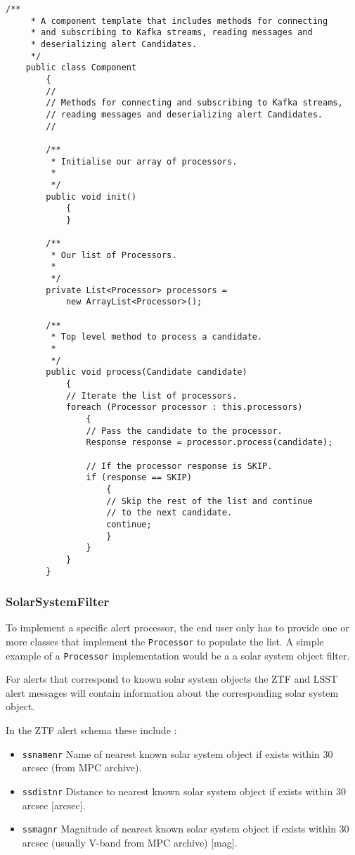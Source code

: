 \documentclass{article}
\newcommand{\ztf} {ZTF\xspace}
\newcommand{\lsst} {LSST\xspace}
\begin{document}
\begin{lstlisting}[style=Java]
    /**
     * A component template that includes methods for connecting
     * and subscribing to Kafka streams, reading messages and
     * deserializing alert Candidates.
     */
    public class Component
        {
        //
        // Methods for connecting and subscribing to Kafka streams,
        // reading messages and deserializing alert Candidates.
        //

        /**
         * Initialise our array of processors.
         *
         */
        public void init()
            {
            }

        /**
         * Our list of Processors.
         *
         */
        private List<Processor> processors =
            new ArrayList<Processor>();

        /**
         * Top level method to process a candidate.
         *
         */
        public void process(Candidate candidate)
            {
            // Iterate the list of processors.
            foreach (Processor processor : this.processors)
                {
                // Pass the candidate to the processor.
                Response response = processor.process(candidate);

                // If the processor response is SKIP.
                if (response == SKIP)
                    {
                    // Skip the rest of the list and continue
                    // to the next candidate.
                    continue;
                    }
                }
            }
        }
\end{lstlisting}

\subsubsection{SolarSystemFilter}
\label{java-interfaces.SolarSystemFilter}

To implement a specific alert processor, the end user only has to provide one or more classes that implement the \texttt{Processor} to populate the list. A simple example of a \texttt{Processor} implementation would be a a solar system object filter.

For alerts that correspond to known solar system objects the \ztf and \lsst alert messages will contain information about the corresponding solar system object.

In the \ztf alert schema these include :
\begin{itemize}
  \item \texttt{ssnamenr} Name of nearest known solar system object if exists within 30 arcsec (from MPC archive).
  \item \texttt{ssdistnr} Distance to nearest known solar system object if exists within 30 arcsec [arcsec].
  \item \texttt{ssmagnr} Magnitude of nearest known solar system object if exists within 30 arcsec (usually V-band from MPC archive) [mag].
\end{itemize}
\end{document}
